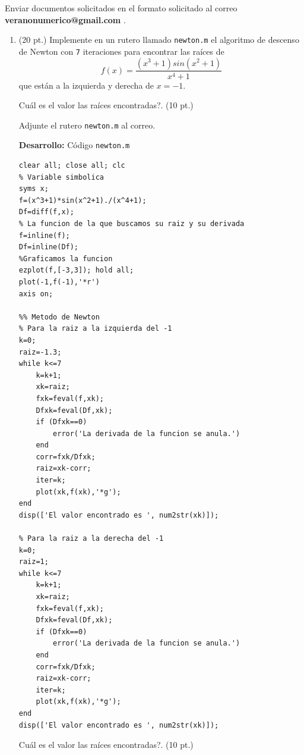 \documentclass[11pt]{article}
\begin{document}
Enviar documentos solicitados en el formato solicitado al correo 
\textbf{veranonumerico@gmail.com} .
\begin{enumerate}
\item (20 pt.) Implemente en un rutero llamado \texttt{newton.m} el algoritmo de descenso de Newton con \texttt{7} iteraciones para encontrar las ra\'ices de 
$$
f(x)= \frac{(x^3+1)sin(x^2+1)}{x^4+1}
$$
que est\'an a la izquierda y derecha de $x=-1$.

\textquestiondown Cu\'al es el valor las ra\'ices encontradas?. (10 pt.)

\fbox{ \begin{minipage}{\textwidth}   \hfill\vspace{1cm}   \end{minipage} } 

Adjunte el rutero \texttt{newton.m} al correo.

\textbf{Desarrollo:} C\'odigo \texttt{newton.m} 

\begin{lstlisting}
clear all; close all; clc
% Variable simbolica
syms x;
f=(x^3+1)*sin(x^2+1)./(x^4+1);
Df=diff(f,x);
% La funcion de la que buscamos su raiz y su derivada
f=inline(f);
Df=inline(Df);
%Graficamos la funcion
ezplot(f,[-3,3]); hold all;
plot(-1,f(-1),'*r')
axis on;

%% Metodo de Newton
% Para la raiz a la izquierda del -1
k=0;
raiz=-1.3;
while k<=7
    k=k+1;
    xk=raiz;
    fxk=feval(f,xk);
    Dfxk=feval(Df,xk);
    if (Dfxk==0)
        error('La derivada de la funcion se anula.')
    end
    corr=fxk/Dfxk;
    raiz=xk-corr;
    iter=k;
    plot(xk,f(xk),'*g');
end
disp(['El valor encontrado es ', num2str(xk)]);

% Para la raiz a la derecha del -1
k=0;
raiz=1;
while k<=7
    k=k+1;
    xk=raiz;
    fxk=feval(f,xk);
    Dfxk=feval(Df,xk);
    if (Dfxk==0)
        error('La derivada de la funcion se anula.')
    end
    corr=fxk/Dfxk;
    raiz=xk-corr;
    iter=k;
    plot(xk,f(xk),'*g');
end
disp(['El valor encontrado es ', num2str(xk)]);
\end{lstlisting}

\textquestiondown Cu\'al es el valor las ra\'ices encontradas?. (10 pt.)




\end{enumerate}
\end{document}
